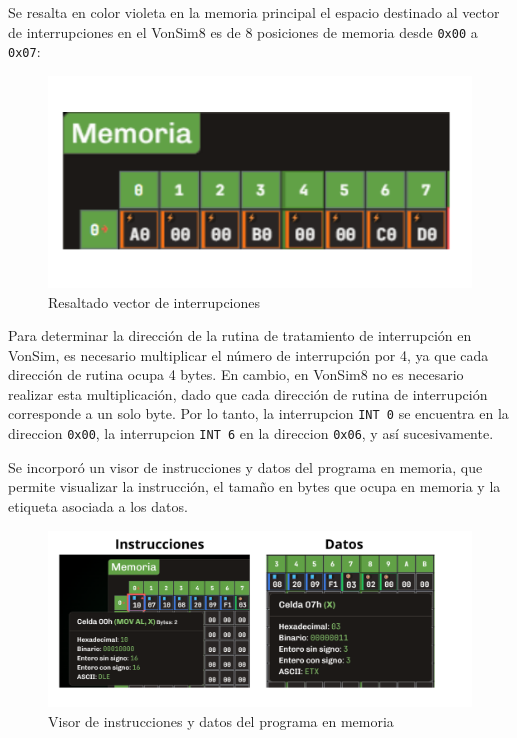 \documentclass[12pt,oneside]{templates/unerthesis}
\begin{document}
Se resalta en color violeta en la memoria principal el espacio destinado al vector de interrupciones en el VonSim8 es de 8 posiciones de memoria desde \texttt{0x00} a \texttt{0x07}:

\begin{figure}

{\centering \includegraphics[width=0.85\linewidth]{images/resaltadoint} 

}

\caption{Resaltado vector de interrupciones}\label{fig:resaltadointsp}
\end{figure}

Para determinar la dirección de la rutina de tratamiento de interrupción en VonSim, es necesario multiplicar el número de interrupción por 4, ya que cada dirección de rutina ocupa 4 bytes. En cambio, en VonSim8 no es necesario realizar esta multiplicación, dado que cada dirección de rutina de interrupción corresponde a un solo byte. Por lo tanto, la interrupcion \texttt{INT\ 0} se encuentra en la direccion \texttt{0x00}, la interrupcion \texttt{INT\ 6} en la direccion \texttt{0x06}, y así sucesivamente.

Se incorporó un visor de instrucciones y datos del programa en memoria, que permite visualizar la instrucción, el tamaño en bytes que ocupa en memoria y la etiqueta asociada a los datos.

\begin{figure}

{\centering \includegraphics[width=0.85\linewidth]{images/visorprog} 

}

\caption{Visor de instrucciones y datos del programa en memoria}\label{fig:visorprog}
\end{figure}
\end{document}
